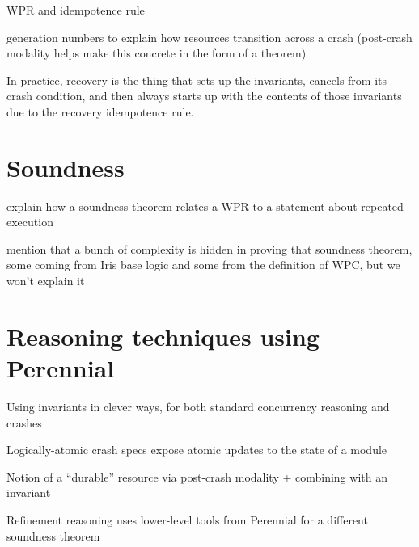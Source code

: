 WPR and idempotence rule

generation numbers to explain how resources transition across a crash
(post-crash modality helps make this concrete in the form of a theorem)

In practice, recovery is the thing that sets up the invariants, cancels from its
crash condition, and then always starts up with the contents of those
invariants due to the recovery idempotence rule.

\section{Soundness}

explain how a soundness theorem relates a WPR to a statement about repeated
execution

mention that a bunch of complexity is hidden in proving that soundness theorem,
some coming from Iris base logic and some from the definition of WPC, but we
won't explain it

\section{Reasoning techniques using Perennial}

Using invariants in clever ways, for both standard concurrency reasoning and
crashes

Logically-atomic crash specs expose atomic updates to the state of a module

Notion of a ``durable'' resource via post-crash modality + combining with an
invariant

Refinement reasoning uses lower-level tools from Perennial for a different
soundness theorem
